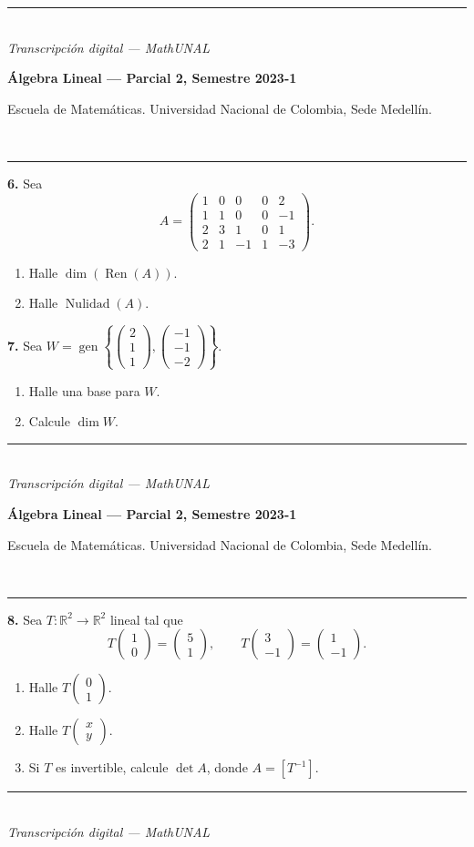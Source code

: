 \documentclass[11pt]{article}
\newcommand{\examheader}{%
  \noindent
  \begin{minipage}[t]{0.6\linewidth}
    {\small\bfseries Álgebra Lineal --- Parcial 2, Semestre 2023-1}\\
  \end{minipage}%
  \hfill
  \begin{minipage}[t]{0.35\linewidth}
    \raggedleft\small Escuela de Matemáticas. Universidad Nacional de Colombia, Sede Medellín.
  \end{minipage}\\[2pt]
  \rule{\linewidth}{0.6pt}
}
\newcommand{\examfooter}{%
  \vfill
  \rule{\linewidth}{0.4pt}\\[1pt]
  {\scriptsize\textit{Transcripción digital --- MathUNAL}\hfill\textcolor{unalblue}{\textbf{\thepage}}}
}
\begin{document}
\examfooter
\newpage

\examheader

\textbf{6.} Sea
\[
A = \begin{pmatrix} 1&0&0&0&2\\ 1&1&0&0&-1\\ 2&3&1&0&1\\ 2&1&-1&1&-3 \end{pmatrix}.
\]

\begin{enumerate}[label=\alph*)]
\item Halle $\dim(\operatorname{Ren}(A))$.
\item Halle $\operatorname{Nulidad}(A)$.
\end{enumerate}

\vspace{1.5cm}

\textbf{7.} Sea $W = \operatorname{gen}\left\{ \begin{pmatrix}2\\1\\1\end{pmatrix}, \begin{pmatrix}-1\\-1\\-2\end{pmatrix} \right\}$.

\begin{enumerate}[label=\alph*)]
\item Halle una base para $W$.
\item Calcule $\dim W$.
\end{enumerate}

\examfooter
\newpage

\examheader

\textbf{8.} Sea $T:\mathbb{R}^2 \to \mathbb{R}^2$ lineal tal que
\[
T\begin{pmatrix}1\\0\end{pmatrix} = \begin{pmatrix}5\\1\end{pmatrix}, \qquad T\begin{pmatrix}3\\-1\end{pmatrix} = \begin{pmatrix}1\\-1\end{pmatrix}.
\]

\begin{enumerate}[label=\alph*)]
\item Halle $T\begin{pmatrix}0\\1\end{pmatrix}$.
\item Halle $T\begin{pmatrix}x\\y\end{pmatrix}$.
\item Si $T$ es invertible, calcule $\det A$, donde $A = [T^{-1}]$.
\end{enumerate}

\examfooter
\end{document}
